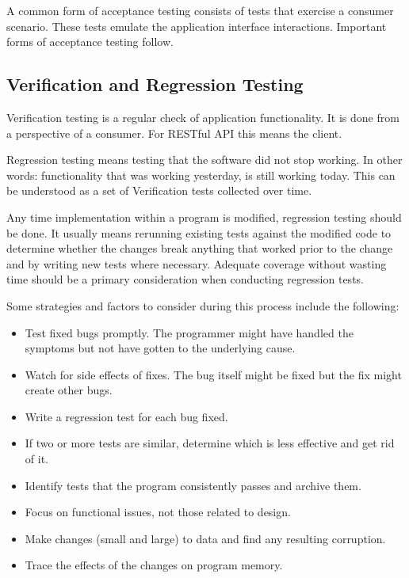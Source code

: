 	A common form of acceptance testing consists of tests that exercise a consumer scenario. These tests emulate the
	application interface interactions. Important forms of acceptance testing follow.
	
	\subsection{Verification and Regression Testing}
	
	Verification testing is a regular check of application functionality. It is done from a perspective of a consumer. For
	RESTful API this means the client.
	
	Regression testing means testing that the software did not stop working. In other words: functionality that was
	working yesterday, is still working today. This can be understood as a set of Verification tests collected over time.
	
	\cite{msdnregression}
	Any time implementation within a program is modified, regression testing should be done. It usually means rerunning
	existing tests against the modified code to determine whether the changes break anything that worked prior to the
	change and by writing new tests where necessary. Adequate coverage without wasting time should be a primary
	consideration when conducting regression tests.
	
	Some strategies and factors to consider during this process include the following:
	
	\begin{itemize}
		\item Test fixed bugs promptly. The programmer might have handled the symptoms but not have gotten to the underlying
		cause.
		\item Watch for side effects of fixes. The bug itself might be fixed but the fix might create other bugs.
		\item Write a regression test for each bug fixed.
		\item If two or more tests are similar, determine which is less effective and get rid of it.
		\item Identify tests that the program consistently passes and archive them.
		\item Focus on functional issues, not those related to design.
		\item Make changes (small and large) to data and find any resulting corruption.
		\item Trace the effects of the changes on program memory.
	\end{itemize}
	
